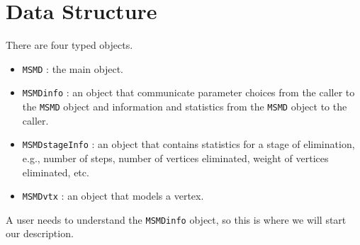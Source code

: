 \par
\section{Data Structure}
\par
There are four typed objects.
\begin{itemize}
\item
{\tt MSMD} : the main object.
\item
{\tt MSMDinfo} : an object that communicate parameter choices from
the caller to the {\tt MSMD} object and information and statistics 
from the {\tt MSMD} object to the caller.
\item
{\tt MSMDstageInfo} : an object that contains statistics for a
stage of elimination, e.g., number of steps, number of vertices
eliminated, weight of vertices eliminated, etc.
\item
{\tt MSMDvtx} : an object that models a vertex.
\end{itemize}
A user needs to understand the {\tt MSMDinfo} object, 
so this is where we will start our description.
\par
\par
